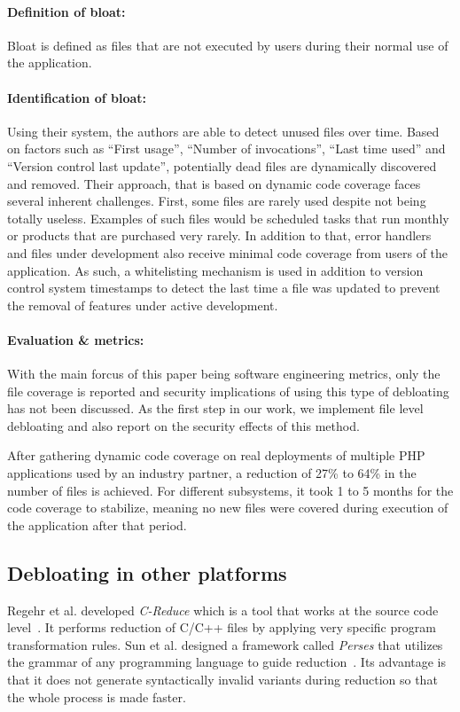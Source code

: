 \paragraph{Definition of bloat:} Bloat is defined as files that are not executed by users during their normal use of the application.
\paragraph{Identification of bloat:} Using their system, the authors are able to detect unused files over time. Based on factors such as ``First usage'', ``Number of invocations'', ``Last time used'' and ``Version control last update'', potentially dead files are dynamically discovered and removed. Their approach, that is based on dynamic code coverage faces several inherent challenges. First, some files are rarely used despite not being totally useless. Examples of such files would be scheduled tasks that run monthly or products that are purchased very rarely. In addition to that, error handlers and files under development also receive minimal code coverage from users of the application. As such, a whitelisting mechanism is used in addition to version control system timestamps to detect the last time a file was updated to prevent the removal of features under active development.
\paragraph{Evaluation \& metrics:} With the main forcus of this paper being software engineering metrics, only the file coverage is reported and security implications of using this type of debloating has not been discussed. As the first step in our work, we implement file level debloating and also report on the security effects of this method.

After gathering dynamic code coverage on real deployments of multiple PHP applications used by an industry partner, a reduction of 27\% to 64\% in the number of files is achieved. For different subsystems, it took 1 to 5 months for the code coverage to stabilize, meaning no new files were covered during execution of the application after that period.

\subsection{Debloating in other platforms}

Regehr et al. developed \textit{C-Reduce} which is a tool that works at the source code level~\cite{regehr2012CReduce}.
It performs reduction of C/C++ files by applying very specific program transformation rules.
Sun et al. designed a framework called \textit{Perses} that utilizes the grammar of any programming language to guide reduction~\cite{sun2018perses}.
Its advantage is that it does not generate syntactically invalid variants during reduction so that the whole process is made faster.

